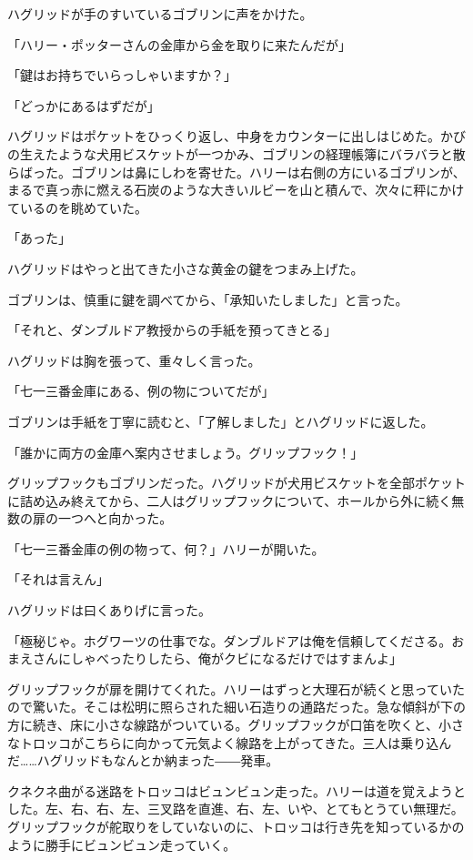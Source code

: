 \documentclass[10pt,a4paper]{article}
\begin{document}
\begin{CJK}{UTF8}{min}
ハグリッドが手のすいているゴブリンに声をかけた。

「ハリー・ポッターさんの金庫から金を取りに来たんだが」

「鍵はお持ちでいらっしゃいますか？」

「どっかにあるはずだが」

ハグリッドはポケットをひっくり返し、中身をカウンターに出しはじめた。かびの生えたような犬用ビスケットが一つかみ、ゴブリンの経理帳簿にバラバラと散らばった。ゴブリンは鼻にしわを寄せた。ハリーは右側の方にいるゴブリンが、まるで真っ赤に燃える石炭のような大きいルビーを山と積んで、次々に秤にかけているのを眺めていた。

「あった」

ハグリッドはやっと出てきた小さな黄金の鍵をつまみ上げた。

ゴブリンは、慎重に鍵を調べてから、「承知いたしました」と言った。

「それと、ダンブルドア教授からの手紙を預ってきとる」

ハグリッドは胸を張って、重々しく言った。

「七一三番金庫にある、例の物についてだが」

ゴブリンは手紙を丁寧に読むと、「了解しました」とハグリッドに返した。

「誰かに両方の金庫へ案内させましょう。グリップフック！」

グリップフックもゴブリンだった。ハグリッドが犬用ビスケットを全部ポケットに詰め込み終えてから、二人はグリップフックについて、ホールから外に続く無数の扉の一つへと向かった。

「七一三番金庫の例の物って、何？」ハリーが開いた。

「それは言えん」

ハグリッドは曰くありげに言った。

「極秘じゃ。ホグワーツの仕事でな。ダンブルドアは俺を信頼してくださる。おまえさんにしゃべったりしたら、俺がクビになるだけではすまんよ」

グリップフックが扉を開けてくれた。ハリーはずっと大理石が続くと思っていたので驚いた。そこは松明に照らされた細い石造りの通路だった。急な傾斜が下の方に続き、床に小さな線路がついている。グリップフックが口笛を吹くと、小さなトロッコがこちらに向かって元気よく線路を上がってきた。三人は乗り込んだ……ハグリッドもなんとか納まった――発車。

クネクネ曲がる迷路をトロッコはビュンビュン走った。ハリーは道を覚えようとした。左、右、右、左、三叉路を直進、右、左、いや、とてもとうてい無理だ。グリップフックが舵取りをしていないのに、トロッコは行き先を知っているかのように勝手にビュンビュン走っていく。


\end{CJK}
\end{document}
